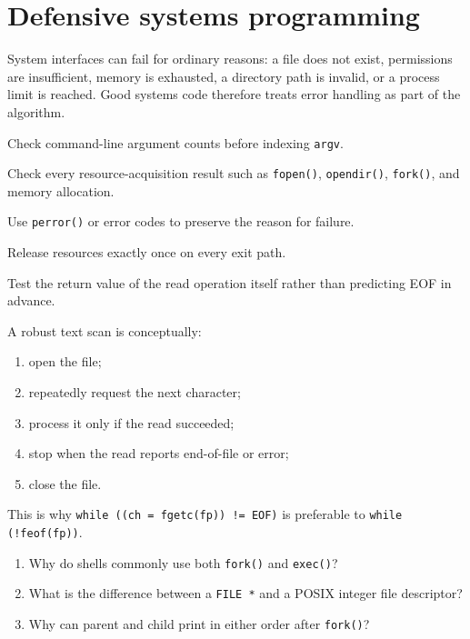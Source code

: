 \section{Defensive systems programming}
System interfaces can fail for ordinary reasons: a file does not exist, permissions are insufficient, memory is exhausted, a directory path is invalid, or a process limit is reached. Good systems code therefore treats error handling as part of the algorithm.
\begin{mlsteps}
  \item Check command-line argument counts before indexing \texttt{argv}.
  \item Check every resource-acquisition result such as \texttt{fopen()}, \texttt{opendir()}, \texttt{fork()}, and memory allocation.
  \item Use \texttt{perror()} or error codes to preserve the reason for failure.
  \item Release resources exactly once on every exit path.
  \item Test the return value of the read operation itself rather than predicting EOF in advance.
\end{mlsteps}

\begin{workedexample}
A robust text scan is conceptually:
\begin{enumerate}
  \item open the file;
  \item repeatedly request the next character;
  \item process it only if the read succeeded;
  \item stop when the read reports end-of-file or error;
  \item close the file.
\end{enumerate}
This is why \texttt{while ((ch = fgetc(fp)) != EOF)} is preferable to \texttt{while (!feof(fp))}.
\end{workedexample}

\begin{quickcheck}
\begin{enumerate}
  \item Why do shells commonly use both \texttt{fork()} and \texttt{exec()}?
  \item What is the difference between a \texttt{FILE *} and a POSIX integer file descriptor?
  \item Why can parent and child print in either order after \texttt{fork()}?
\end{enumerate}
\end{quickcheck}
